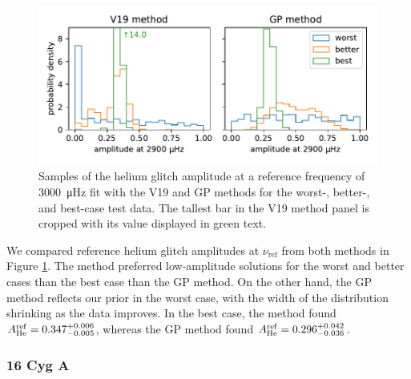 \begin{figure}
    \centering
    \includegraphics{figures/glitch-test-amplitude.pdf}
    \caption{Samples of the helium glitch amplitude at a reference frequency of \SI{3000}{\micro\hertz} fit with the V19 and GP methods for the worst-, better-, and best-case test data. The tallest bar in the V19 method panel is cropped with its value displayed in green text.}
    \label{fig:glitch-test-amplitude}
\end{figure}

We compared reference helium glitch amplitudes at \(\nu_\mathrm{ref}\) from both methods in Figure \ref{fig:glitch-test-amplitude}. The  method preferred low-amplitude solutions for the worst and better cases than the best case than the GP method. On the other hand, the GP method reflects our prior in the worst case, with the width of the distribution shrinking as the data improves. In the best case, the  method found \(A_{{\mathrm{He}}}^\mathrm{ref} = 0.347_{-0.005}^{+0.006}\), whereas the GP method found \(A_{{\mathrm{He}}}^\mathrm{ref} = 0.296_{-0.036}^{+0.042}\).



\subsubsection{16 Cyg A}

